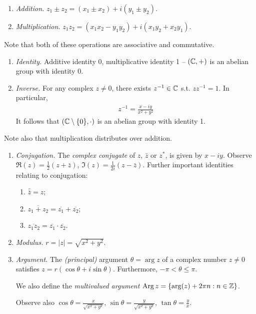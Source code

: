 \documentclass{../../template/note}
\begin{document}
    \begin{enumerate}[label=\protect\circled{\arabic*}]
        \item \emph{Addition.} \(z_1 \pm z_2 = (x_1 \pm x_2) + i(y_1 \pm y_2)\).
        \item \emph{Multiplication.} \(z_1z_2 = (x_1x_2-y_1y_2)+i(x_1y_2+x_2y_1)\).
    \end{enumerate}
    Note that both of these operations are associative and commutative.
    \begin{enumerate}[label=\protect\circled{\arabic*},resume]
        \item \emph{Identity.} Additive identity 0, multiplicative identity 1 -- \((\mathbb C, +)\) is an abelian group with identity 0.
        \item \emph{Inverse.} For any complex \(z \neq 0\), there exists \(z^{-1} \in \mathbb C\) s.t. \(zz^{-1} = 1\). In particular,
        \begin{align*}
            z^{-1} = \frac{x-iy}{x^2+y^2}
        \end{align*}
        It follows that \((\mathbb C \setminus \{0\}, \cdot)\) is an abelian group with identity 1.
    \end{enumerate}
    Note also that multiplication distributes over addition.
    \begin{enumerate}[label=\protect\circled{\arabic*},resume]
        \item \emph{Conjugation.} The \emph{complex conjugate} of \(z\), \(\bar z\) or \(z^*\), is given by \(x-iy\). Observe \(\Re(z) = \frac{1}{2}(z+\bar z)\), \(\Im(z) = \frac{1}{2i}(z-\bar z)\). Further important identities relating to conjugation:
        \begin{enumerate}
            \item \(\bar{\bar z} = z\);
            \item \(\overline{z_1 + z_2} = \overline{z_1} + \overline{z_2}\);
            \item \(\overline{z_1z_2} = \overline{z_1}\cdot\overline{z_2}\).
        \end{enumerate}
        
        \item \emph{Modulus.} \(r = |z| = \sqrt{x^2+y^2}\).
        
        \item \emph{Argument.} The \emph{(principal)} argument \(\theta = \arg z\) of a complex number \(z \neq 0\) satisfies \(z = r(\cos \theta + i \sin \theta)\). Furthermore, \(-\pi < \theta \leq \pi\).
        
        We also define the \emph{multivalued argument} \(\operatorname{Arg} z = \{\arg(z) + 2\pi n : n \in \mathbb Z\}\).
        
        Observe also \(\cos \theta = \frac{x}{\sqrt{x^2+y^2}}\), \(\sin \theta = \frac{y}{\sqrt{x^2+y^2}}\), \(\tan \theta = \frac y x\).

    \end{enumerate}
\end{document}
